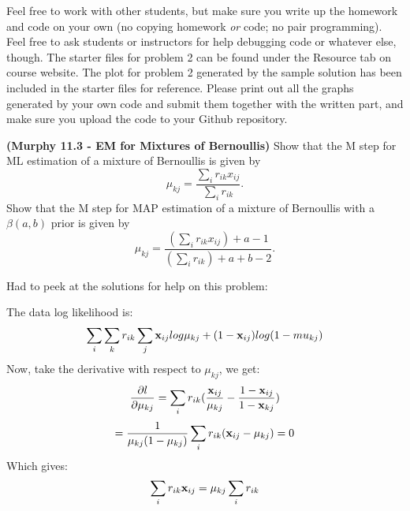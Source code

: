 \documentclass[12pt,letterpaper,fleqn]{hmcpset}
\begin{document}
Feel free to work with other students, but make sure you write up the homework
and code on your own (no copying homework \textit{or} code; no pair programming).
Feel free to ask students or instructors for help debugging code or whatever else,
though.
\newline
\newline
The starter files for problem 2 can be found under the Resource tab on course website. The plot for problem 2 generated by the sample solution has been included in the starter files for reference. Please print out all the graphs generated by your own code and submit them together with the written part, and make sure you upload the code to your Github repository.

\begin{problem}[1]
\textbf{(Murphy 11.3 - EM for Mixtures of Bernoullis)} Show that the M step for ML estimation
of a mixture of Bernoullis is given by
\[
    \mu_{kj} = \frac{\sum_i r_{ik}x_{ij}}{\sum_i r_{ik}}.
\]
Show that the M step for MAP estimation of a mixture of Bernoullis with a $\beta(a,b)$ prior
is given by
\[
    \mu_{kj} = \frac{\left(\sum_i r_{ik}x_{ij}\right) + a - 1}{\left(\sum_i r_{ik}\right) + a + b - 2}.
\]
\end{problem}
\begin{solution}
Had to peek at the solutions for help on this problem:

The data log likelihood is:
\[ \sum_i \sum_k r_{ik} \sum_j {\bf x}_{ij} log \mu_{kj} + (1 - {\bf x}_{ij})log(1-mu_{kj}) \]
Now, take the derivative with respect to $\mu_{kj}$, we get: \[
\frac{\partial l}{\partial \mu_{kj}} = \sum_i r_{ik} (\frac{{\bf x}_{ij}}{\mu_{kj}} - \frac{1-{\bf x}_{ij}}{1-{\bf x}_{kj}})
\] 
\[ = \frac{1}{\mu_{kj}(1-\mu_{kj})} \sum_i r_{ik} ({\bf x}_{ij} - \mu_{kj} ) = 0 \]
Which gives: \[
\sum_i r_{ik} {\bf x}_{ij} = \mu_{kj} \sum_i r_{ik} \]

\end{solution}
\newpage
\end{document}

